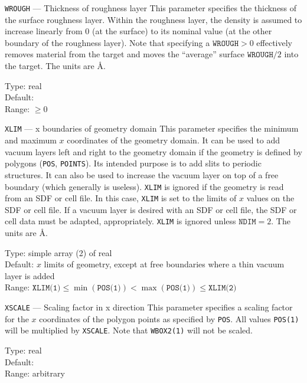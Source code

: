 \begin{keydescription}{\texttt{WROUGH} --- Thickness of roughness layer}
%
  This parameter specifies the thickness of the surface roughness layer.
  Within the roughness layer, the density is assumed to increase linearly
  from 0 (at the surface) to its nominal value (at the other boundary of the
  roughness layer). Note that specifying a $\texttt{WROUGH} > 0$ effectively
  removes material from the target and moves the ``average'' surface
  $\texttt{WROUGH}/2$ into the target. The units are \AA. 
  \begin{keytab}
    Type:    \> real \\
    Default:  \\
    Range:   \> $\ge 0$
  \end{keytab}
\end{keydescription}

\begin{keydescription}{\texttt{XLIM} --- x boundaries of geometry domain}
%
  This parameter specifies the minimum and maximum $x$ coordinates of the
  geometry domain. It can be used to add vacuum layers left and right to
  the geometry domain if the geometry is defined by polygons 
  (\texttt{POS}, \texttt{POINTS}). Its intended 
  purpose is to add slits to periodic structures. It can also be used to
  increase the vacuum layer on top of a free boundary (which generally is
  useless). \texttt{XLIM} is
  ignored if the geometry is read from an SDF or cell file. In this case, 
  \texttt{XLIM} is set to the limits of $x$ values on the SDF or cell file. 
  If a vacuum layer is desired with an SDF or cell file, the SDF or cell 
  data must be adapted, appropriately. \texttt{XLIM} is ignored unless
  $\texttt{NDIM}=2$. The units are \AA.
  \begin{keytab}
    Type:    \> simple array (2) of real \\
    Default: \> $x$ limits of geometry, except at free boundaries where
                a thin vacuum \\
             \> layer is added  \\
    Range:   \> $\texttt{XLIM(1)} \le \min(\texttt{POS(1)}) <  
                \max(\texttt{POS(1)}) \le \texttt{XLIM(2)}$ 
  \end{keytab}
\end{keydescription}

\begin{keydescription}{\texttt{XSCALE} --- Scaling factor in x direction}
%
  This parameter specifies a scaling factor for the $x$ coordinates of the
  polygon points as specified by \texttt{POS}. All values \texttt{POS(1)} will
  be multiplied by \texttt{XSCALE}. Note that \texttt{WBOX2(1)} will not be 
  scaled. 
  \begin{keytab}
    Type:    \> real \\
    Default:  \\
    Range:   \> arbitrary
  \end{keytab}
\end{keydescription}

